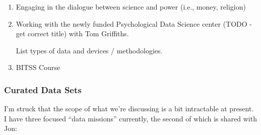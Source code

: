 \documentclass[12pt]{article}
\begin{document}
\begin{enumerate}
    \item Engaging in the dialogue between science and power (i.e., money,
        religion)

    \item Working with the newly funded Psychological Data Science center (TODO
        - get correct title) with Tom Griffiths.

        List types of data and devices / methodologies.

    \item BITSS Course

\end{enumerate}

\subsubsection*{Curated Data Sets}

I'm struck that the scope of what we're discussing is a bit intractable at
present. I have three focused “data missions” currently, the second of which is
shared with Jon:
\end{document}
